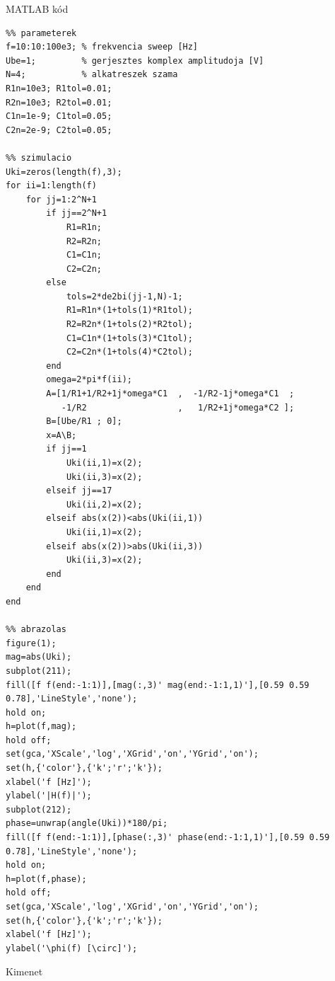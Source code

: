 \documentclass[12pt,a4paper]{report}
\begin{document}
\clearpage

{\centering\huge MATLAB k\'{o}d\\}

\vspace{5mm}

\lstset{style=MATLAB_CODE}
\begin{lstlisting}
%% parameterek
f=10:10:100e3; % frekvencia sweep [Hz]
Ube=1;         % gerjesztes komplex amplitudoja [V]
N=4;           % alkatreszek szama
R1n=10e3; R1tol=0.01;
R2n=10e3; R2tol=0.01;
C1n=1e-9; C1tol=0.05;
C2n=2e-9; C2tol=0.05;

%% szimulacio
Uki=zeros(length(f),3);
for ii=1:length(f)
    for jj=1:2^N+1
        if jj==2^N+1
            R1=R1n;
            R2=R2n;
            C1=C1n;
            C2=C2n;
        else
            tols=2*de2bi(jj-1,N)-1;
            R1=R1n*(1+tols(1)*R1tol);
            R2=R2n*(1+tols(2)*R2tol);
            C1=C1n*(1+tols(3)*C1tol);
            C2=C2n*(1+tols(4)*C2tol);
        end
        omega=2*pi*f(ii);
        A=[1/R1+1/R2+1j*omega*C1  ,  -1/R2-1j*omega*C1  ;
           -1/R2                  ,   1/R2+1j*omega*C2 ];
        B=[Ube/R1 ; 0];
        x=A\B;
        if jj==1
            Uki(ii,1)=x(2);
            Uki(ii,3)=x(2);
        elseif jj==17
            Uki(ii,2)=x(2);
        elseif abs(x(2))<abs(Uki(ii,1))
            Uki(ii,1)=x(2);
        elseif abs(x(2))>abs(Uki(ii,3))
            Uki(ii,3)=x(2);
        end
    end
end

%% abrazolas
figure(1);
mag=abs(Uki);
subplot(211);
fill([f f(end:-1:1)],[mag(:,3)' mag(end:-1:1,1)'],[0.59 0.59 0.78],'LineStyle','none');
hold on;
h=plot(f,mag);
hold off;
set(gca,'XScale','log','XGrid','on','YGrid','on');
set(h,{'color'},{'k';'r';'k'});
xlabel('f [Hz]');
ylabel('|H(f)|');
subplot(212);
phase=unwrap(angle(Uki))*180/pi;
fill([f f(end:-1:1)],[phase(:,3)' phase(end:-1:1,1)'],[0.59 0.59 0.78],'LineStyle','none');
hold on;
h=plot(f,phase);
hold off;
set(gca,'XScale','log','XGrid','on','YGrid','on');
set(h,{'color'},{'k';'r';'k'});
xlabel('f [Hz]');
ylabel('\phi(f) [\circ]');
\end{lstlisting}

\clearpage

{\centering\huge Kimenet\\}
\end{document}
